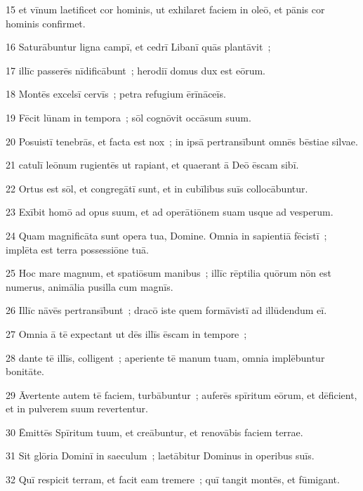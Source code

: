 \psalmVerse
  {\phantom{0}15}
  {et vīnum laetificet cor hominis, ut exhilaret faciem in oleō, et pānis cor hominis confirmet.}


\psalmVerse
  {\phantom{0}16}
  {Saturābuntur ligna campī, et cedrī Libanī quās plantāvit~;}


\psalmVerse
  {\phantom{0}17}
  {illīc passerēs nīdificābunt~; herodiī domus dux est eōrum.}


\psalmVerse
  {\phantom{0}18}
  {Montēs excelsī cervīs~; petra refugium ērīnāceīs.}


\psalmVerse
  {\phantom{0}19}
  {Fēcit lūnam in tempora~; sōl cognōvit occāsum suum.}


\psalmVerse
  {\phantom{0}20}
  {Posuistī tenebrās, et facta est nox~; in ipsā pertransībunt omnēs bēstiae silvae.}


\psalmVerse
  {\phantom{0}21}
  {catulī leōnum rugientēs ut rapiant, et quaerant ā Deō ēscam sibī.}


\psalmVerse
  {\phantom{0}22}
  {Ortus est sōl, et congregātī sunt, et in cubīlibus suīs collocābuntur.}


\psalmVerse
  {\phantom{0}23}
  {Exībit homō ad opus suum, et ad operātiōnem suam usque ad vesperum.}


\psalmVerse
  {\phantom{0}24}
  {Quam magnificāta sunt opera tua, Domine. Omnia in sapientiā fēcistī~; implēta est terra possessiōne tuā.}


\psalmVerse
  {\phantom{0}25}
  {Hoc mare magnum, et spatiōsum manibus~; illīc rēptilia quōrum nōn est numerus, animālia pusilla cum magnīs.}


\psalmVerse
  {\phantom{0}26}
  {Illīc nāvēs pertransībunt~; dracō iste quem formāvistī ad illūdendum eī.}


\psalmVerse
  {\phantom{0}27}
  {Omnia ā tē expectant ut dēs illīs ēscam in tempore~;}


\psalmVerse
  {\phantom{0}28}
  {dante tē illīs, colligent~; aperiente tē manum tuam, omnia implēbuntur bonitāte.}


\psalmVerse
  {\phantom{0}29}
  {Āvertente autem tē faciem, turbābuntur~; auferēs spīritum eōrum, et dēficient, et in pulverem suum revertentur.}


\psalmVerse
  {\phantom{0}30}
  {Ēmittēs Spīritum tuum, et creābuntur, et renovābis faciem terrae.}


\psalmVerse
  {\phantom{0}31}
  {Sit glōria Dominī in saeculum~; laetābitur Dominus in operibus suīs.}


\psalmVerse
  {\phantom{0}32}
  {Quī respicit terram, et facit eam tremere~; quī tangit montēs, et fūmigant.}


